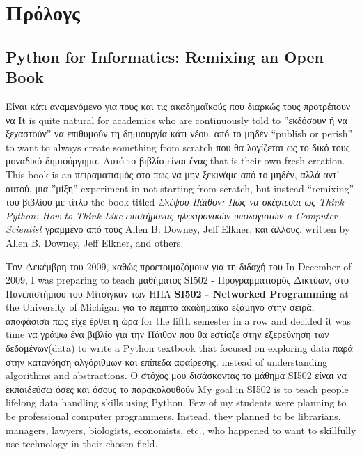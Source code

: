 
\chapter{Πρόλογς}

\section*{Python for Informatics: Remixing an Open Book}

Είναι κάτι αναμενόμενο για τους και τις ακαδημαϊκούς που διαρκώς τους προτρέπουν να
It is quite natural for academics who are continuously told to 
''εκδόσουν ή να ξεχαστούν'' να επιθυμούν τη δημιουργία κάτι νέου, από το μηδέν
``publish or perish'' to want to always create something from scratch
που θα λογίζεται ως το δικό τους μοναδικό δημιούργημα. Αυτό το βιβλίο είναι ένας 
that is their own fresh creation.   This book is an 
πειραματισμός στο πως να μην ξεκινάμε από το μηδέν, αλλά αντ' αυτού, μια ''μίξη''
experiment in not starting from scratch, but instead ``remixing''
του βιβλίου με τίτλο
the book titled
\emph{Σκέψου Πάϊθον: Πώς να σκέφτεσαι ως Think Python: How to Think Like
επιστήμονας ηλεκτρονικών υπολογιστών a Computer Scientist}
γραμμένο από τους Allen B. Downey, Jeff Elkner, και άλλους.
written by Allen B. Downey, Jeff Elkner, and others.

Τον Δεκέμβρη του 2009, καθώς προετοιμαζόμουν για τη διδαχή του  
In December of 2009, I was preparing to teach
μαθήματος SI502 - Προγραμματισμός Δικτύων, στο Πανεπιστήμιου του Μίτσιγκαν των ΗΠΑ
{\bf SI502 - Networked Programming} at the University of Michigan
για το πέμπτο ακαδημαϊκό εξάμηνο στην σειρά, αποφάσισα πως είχε έρθει η ώρα
for the fifth semester in a row and decided it was time
να γράψω ένα βιβλίο για την Πάιθον που θα εστίαζε στην εξερεύνηση των δεδομένων(data)
to write a Python textbook that focused on exploring data
παρά στην κατανόηση αλγόριθμων και επίπεδα αφαίρεσης.
instead of understanding algorithms and abstractions.
Ο στόχος μου δισάσκοντας το μάθημα SI502 είναι να εκπαιδεύσω όσες και όσους το παρακολουθούν 
My goal in SI502 is to teach people lifelong data handling 
skills using Python.  Few of my
students were planning to be professional 
computer programmers.  Instead, they
planned to be librarians, managers, lawyers, biologists, economists, etc., 
who happened to want to skillfully use technology in their chosen field.

